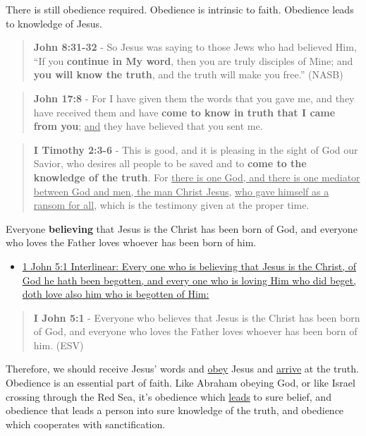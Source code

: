 \documentclass[11pt]{article}
\begin{document}
There is still obedience required. Obedience is intrinsic to faith. Obedience leads to knowledge of Jesus.

\begin{quote}
\textbf{John 8:31-32} - So Jesus was saying to those Jews who had believed Him, “If you \textbf{continue in My word}, then you are truly disciples of Mine; and \textbf{you will know the truth}, and the truth will make you free.” (NASB)
\end{quote}

\begin{quote}
\textbf{John 17:8} - For I have given them the words that you gave me, and they have received them and have \textbf{come to know in truth that I came from you}; \uline{and} they have believed that you sent me.
\end{quote}

\begin{quote}
\textbf{I Timothy 2:3-6} - This is good, and it is pleasing in the sight of God our Savior, who desires all people to be saved and to \textbf{come to the knowledge of the truth}. For \uline{there is one God, and there is one mediator between God and men, the man Christ Jesus}, \uline{who gave himself as a ransom for all}, which is the testimony given at the proper time.
\end{quote}

Everyone \textbf{believing} that Jesus is the Christ has been born of God, and everyone who loves the Father loves whoever has been born of him.

\begin{itemize}
\item \href{https://biblehub.com/interlinear/1\_john/5-1.htm}{1 John 5:1 Interlinear: Every one who is believing that Jesus is the Christ, of God he hath been begotten, and every one who is loving Him who did beget, doth love also him who is begotten of Him:}
\end{itemize}

\begin{quote}
\textbf{I John 5:1} - Everyone who believes that Jesus is the Christ has been born of God, and everyone who loves the Father loves whoever has been born of him. (ESV)
\end{quote}

Therefore, we should receive Jesus' words and \uline{obey} Jesus and \uline{arrive} at the truth. Obedience is an essential part of faith. Like Abraham obeying God, or like Israel crossing through the Red Sea, it's obedience which \uline{leads} to sure belief, and obedience that leads a person into sure knowledge of the truth, and obedience which cooperates with sanctification.
\end{document}
